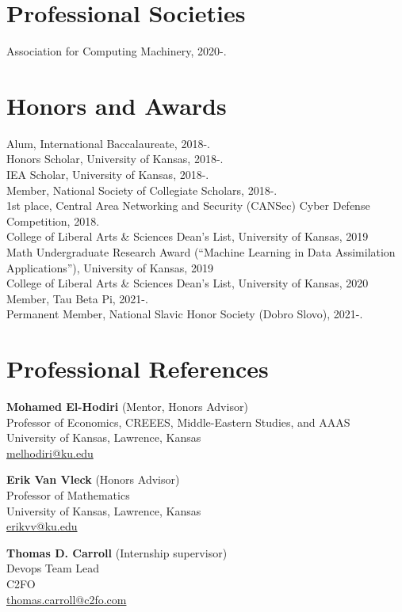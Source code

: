 \documentclass[a4paper, 10pt]{article}
\begin{document}
\section{Professional Societies}

Association for Computing Machinery, 2020-.\\

\section{Honors and Awards}

Alum, International Baccalaureate, 2018-.\\
Honors Scholar, University of Kansas, 2018-.\\
IEA Scholar, University of Kansas, 2018-.\\
Member, National Society of Collegiate Scholars, 2018-.\\
1st place, Central Area Networking and Security (CANSec) Cyber Defense Competition, 2018. \\
College of Liberal Arts \& Sciences Dean’s List, University of Kansas, 2019\\
Math Undergraduate Research Award (``Machine Learning in Data Assimilation Applications''), University of Kansas, 2019\\
College of Liberal Arts \& Sciences Dean’s List, University of Kansas, 2020\\
Member, Tau Beta Pi, 2021-.\\
Permanent Member, National Slavic Honor Society (Dobro Slovo), 2021-.

\section{Professional References}

\textbf{Mohamed El-Hodiri} (Mentor, Honors Advisor)\\
Professor of Economics, CREEES, Middle-Eastern Studies, and AAAS\\
University of Kansas, Lawrence, Kansas\\
\href{mailto:melhodiri@ku.edu}{melhodiri@ku.edu}

\textbf{Erik Van Vleck} (Honors Advisor)\\
Professor of Mathematics\\
University of Kansas, Lawrence, Kansas\\
\href{mailto:erikvv@ku.edu}{erikvv@ku.edu}

\textbf{Thomas D. Carroll} (Internship supervisor)\\
Devops Team Lead\\
C2FO\\
\href{mailto:thomas.carroll@c2fo.com}{thomas.carroll@c2fo.com}
\end{document}

